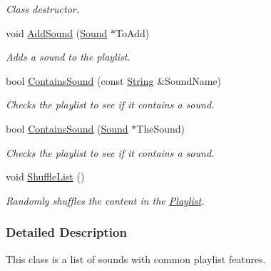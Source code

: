 \begin{DoxyCompactItemize}
\begin{DoxyCompactList}\small\item\em Class destructor. \item\end{DoxyCompactList}\item 
void \hyperlink{classMezzanine_1_1Audio_1_1Playlist_a574b7a451eab384a77a0e114b8664c72}{AddSound} (\hyperlink{classMezzanine_1_1Audio_1_1Sound}{Sound} $\ast$ToAdd)
\begin{DoxyCompactList}\small\item\em Adds a sound to the playlist. \item\end{DoxyCompactList}\item 
bool \hyperlink{classMezzanine_1_1Audio_1_1Playlist_afa6086153b55cdcfed29baaad5566da1}{ContainsSound} (const \hyperlink{namespaceMezzanine_acf9fcc130e6ebf08e3d8491aebcf1c86}{String} \&SoundName)
\begin{DoxyCompactList}\small\item\em Checks the playlist to see if it contains a sound. \item\end{DoxyCompactList}\item 
bool \hyperlink{classMezzanine_1_1Audio_1_1Playlist_a319f906c569d851da502e52fae43cc9d}{ContainsSound} (\hyperlink{classMezzanine_1_1Audio_1_1Sound}{Sound} $\ast$TheSound)
\begin{DoxyCompactList}\small\item\em Checks the playlist to see if it contains a sound. \item\end{DoxyCompactList}\item 
\hypertarget{classMezzanine_1_1Audio_1_1Playlist_a656f958e3fd4fe44cdaf75c0f8487eaf}{
void \hyperlink{classMezzanine_1_1Audio_1_1Playlist_a656f958e3fd4fe44cdaf75c0f8487eaf}{ShuffleList} ()}
\label{classMezzanine_1_1Audio_1_1Playlist_a656f958e3fd4fe44cdaf75c0f8487eaf}

\begin{DoxyCompactList}\small\item\em Randomly shuffles the content in the \hyperlink{classMezzanine_1_1Audio_1_1Playlist}{Playlist}. \item\end{DoxyCompactList}\end{DoxyCompactItemize}


\subsubsection{Detailed Description}
This class is a list of sounds with common playlist features. 

